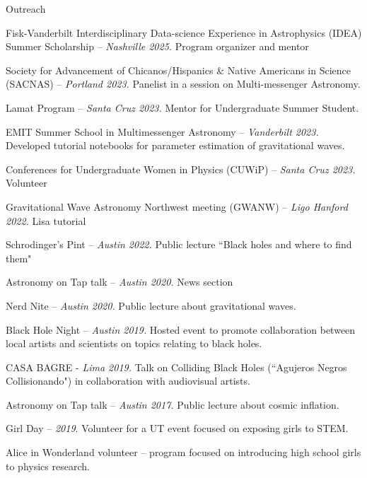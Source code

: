 \documentclass{resume}
\begin{document}
\begin{rSection}{Outreach} \itemsep -2pt
\item Fisk-Vanderbilt Interdisciplinary Data-science Experience in Astrophysics (IDEA) Summer Scholarship --
\textit{Nashville 2025.}
Program organizer and mentor
\item Society for Advancement of Chicanos/Hispanics \& Native Americans in Science (SACNAS) --
\textit{Portland 2023.}
Panelist in a session on Multi-messenger Astronomy.
\item Lamat Program --
\textit{Santa Cruz 2023.}
Mentor for Undergraduate Summer Student.
\item EMIT Summer School in Multimessenger Astronomy -- \textit{Vanderbilt 2023.}
Developed tutorial notebooks for parameter estimation of gravitational waves.
\item Conferences for Undergraduate Women in Physics (CUWiP) -- 
\textit{Santa Cruz 2023.} Volunteer
\item Gravitational Wave Astronomy Northwest meeting (GWANW) --
\textit{Ligo Hanford 2022.} Lisa tutorial
\item Schrodinger's Pint -- \textit{Austin 2022.} Public lecture ``Black holes and where to find them"
\item Astronomy on Tap talk -- \textit{Austin 2020.}
News section
\item Nerd Nite -- \textit{Austin 2020.}
Public lecture about gravitational waves.
\item Black Hole Night -- \textit{Austin 2019.}
Hosted event to promote collaboration between local artists and scientists on topics relating to black holes.
\item CASA BAGRE - \textit{Lima 2019.}
Talk on Colliding Black Holes (``Agujeros Negros Collisionando") in collaboration with audiovisual artists.
\item Astronomy on Tap talk -- \textit{Austin 2017.} 
Public lecture about cosmic inflation.
\item Girl Day -- \textit{2019}. Volunteer for a UT event focused on exposing girls to STEM.
\item Alice in Wonderland volunteer -- program focused on introducing high school girls to physics research.
\end{rSection}
\end{document}
